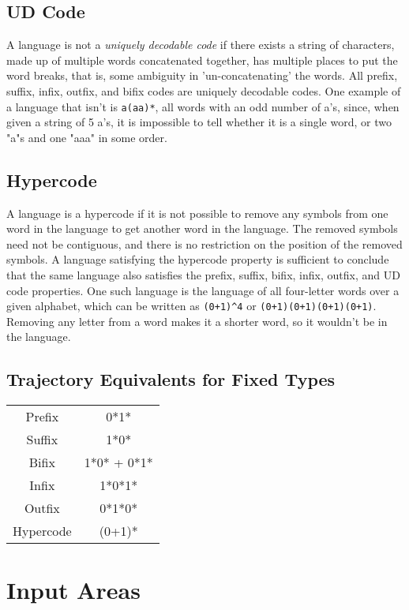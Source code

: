 \documentclass{article}
\begin{document}
\subsection{UD Code}
A language is not a \textit{uniquely decodable code} if there exists a string of characters, made up of multiple words concatenated together, has multiple places to put the word breaks, that is, some ambiguity in 'un-concatenating' the words. All prefix, suffix, infix, outfix, and bifix codes are uniquely decodable codes. One example of a language that isn't is \verb-a(aa)*-, all words with an odd number of a's, since, when given a string of 5 a's, it is impossible to tell whether it is a single word, or two "a"s and one "aaa" in some order. 

\subsection{Hypercode}
A language is a hypercode if it is not possible to remove any symbols from one word in the language to get another word in the language. The removed symbols need not be contiguous, and there is no restriction on the position of the removed symbols. A language satisfying the hypercode property is sufficient to conclude that the same language also satisfies the prefix, suffix, bifix, infix, outfix, and UD code properties. One such language is the language of all four-letter words over a given alphabet, which can be written as \verb-(0+1)^4- or \verb-(0+1)(0+1)(0+1)(0+1)-. Removing any letter from a word makes it a shorter word, so it wouldn't be in the language. 

\subsection{Trajectory Equivalents for Fixed Types}
\begin{center}
\begin{tabular}{c c}
Prefix & 0*1*\\
Suffix & 1*0*\\
Bifix & 1*0* + 0*1*\\
Infix & 1*0*1*\\
Outfix & 0*1*0*\\
Hypercode & (0+1)*
\end{tabular}
\end{center}

\section{Input Areas}
\end{document}
